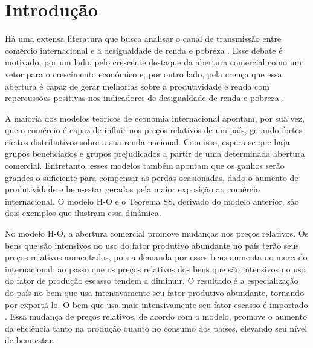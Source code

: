 

\pagestyle{fancy}
\fancyhf{}
\fancyhead[R]{\small\thepage}
\renewcommand{\headrulewidth}{0pt}

\chapter{Introdução} \label{cha:introducao}

Há uma extensa literatura que busca analisar o canal de transmissão entre comércio internacional e a desigualdade de renda e pobreza \cite{ferreira06, castilho12, bayar17, anderson20}. Esse debate é motivado, por um lado, pelo crescente destaque da abertura comercial como um vetor para o crescimento econômico \cite{atkin22} e, por outro lado, pela crença que essa abertura é capaz de gerar melhorias sobre a produtividade e renda com repercussões positivas nos indicadores de desigualdade de renda e pobreza \cite{carneiro06}.

A maioria dos modelos teóricos de economia internacional apontam, por sua vez, que o comércio é capaz de influir nos preços relativos de um país, gerando fortes efeitos distributivos sobre a sua renda nacional. Com isso, espera-se que haja grupos beneficiados e grupos prejudicados a partir de uma determinada abertura comercial. Entretanto, esses modelos também apontam que os ganhos serão grandes o suficiente para compensar as perdas ocasionadas, dado o aumento de produtividade e bem-estar gerados pela maior exposição ao comércio internacional. O modelo H-O \cite{heckscher49, ohlin67} e o Teorema SS, derivado do modelo anterior, \cite{stolper41} são dois exemplos que ilustram essa dinâmica.

No modelo H-O, a abertura comercial promove mudanças nos preços relativos. Os bens que são intensivos no uso do fator produtivo abundante no país terão seus preços relativos aumentados, pois a demanda por esses bens aumenta no mercado internacional; ao passo que os preços relativos dos bens que são intensivos no uso do fator de produção escasso tendem a diminuir. O resultado é a especialização do país no bem que usa intensivamente seu fator produtivo abundante, tornando por exportá-lo. O bem que usa mais intensivamente seu fator escasso é importado \cite{heckscher49, ohlin67}. Essa mudança de preços relativos, de acordo com o modelo, promove o aumento da eficiência tanto na produção quanto no consumo dos países, elevando seu nível de bem-estar.

